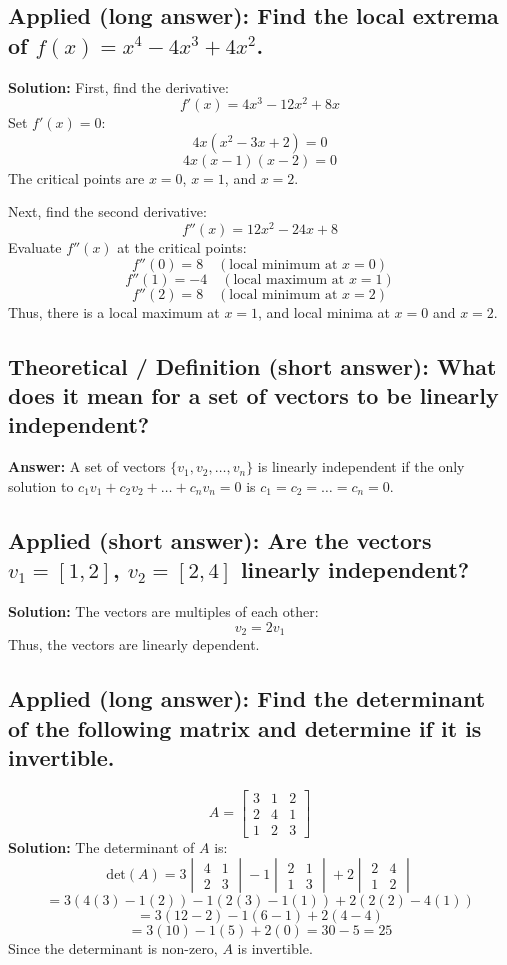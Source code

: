 \documentclass[12pt]{article}
\begin{document}
\subsection{Applied (long answer): Find the local extrema of \( f(x) = x^4 - 4x^3 + 4x^2 \).}
\textbf{Solution:}
First, find the derivative:
\[
f'(x) = 4x^3 - 12x^2 + 8x
\]
Set \( f'(x) = 0 \):
\[
4x(x^2 - 3x + 2) = 0
\]
\[
4x(x - 1)(x - 2) = 0
\]
The critical points are \( x = 0 \), \( x = 1 \), and \( x = 2 \).

Next, find the second derivative:
\[
f''(x) = 12x^2 - 24x + 8
\]
Evaluate \( f''(x) \) at the critical points:
\[
f''(0) = 8 \quad (\text{local minimum at } x = 0)
\]
\[
f''(1) = -4 \quad (\text{local maximum at } x = 1)
\]
\[
f''(2) = 8 \quad (\text{local minimum at } x = 2)
\]
Thus, there is a local maximum at \( x = 1 \), and local minima at \( x = 0 \) and \( x = 2 \).

\subsection{Theoretical / Definition (short answer): What does it mean for a set of vectors to be linearly independent?}
\textbf{Answer:} A set of vectors \( \{v_1, v_2, \dots, v_n\} \) is linearly independent if the only solution to \( c_1 v_1 + c_2 v_2 + \dots + c_n v_n = 0 \) is \( c_1 = c_2 = \dots = c_n = 0 \).

\subsection{Applied (short answer): Are the vectors \( v_1 = [1, 2] \), \( v_2 = [2, 4] \) linearly independent?}
\textbf{Solution:}
The vectors are multiples of each other:
\[
v_2 = 2v_1
\]
Thus, the vectors are linearly dependent.

\subsection{Applied (long answer): Find the determinant of the following matrix and determine if it is invertible.}
\[
A = \begin{bmatrix} 3 & 1 & 2 \\ 2 & 4 & 1 \\ 1 & 2 & 3 \end{bmatrix}
\]
\textbf{Solution:}
The determinant of \( A \) is:
\[
\text{det}(A) = 3 \begin{vmatrix} 4 & 1 \\ 2 & 3 \end{vmatrix} - 1 \begin{vmatrix} 2 & 1 \\ 1 & 3 \end{vmatrix} + 2 \begin{vmatrix} 2 & 4 \\ 1 & 2 \end{vmatrix}
\]
\[
= 3(4(3) - 1(2)) - 1(2(3) - 1(1)) + 2(2(2) - 4(1))
\]
\[
= 3(12 - 2) - 1(6 - 1) + 2(4 - 4)
\]
\[
= 3(10) - 1(5) + 2(0) = 30 - 5 = 25
\]
Since the determinant is non-zero, \( A \) is invertible.
\end{document}

